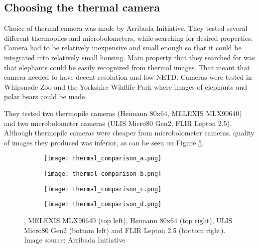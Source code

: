 \subsection{ Choosing the thermal camera}

Choice of thermal camera was made by Arribada Initiative\cite{thermal_comparison}.
They tested several different thermopiles and microbolometers, while searching for desired properties.
Camera had to be relatively inexpensive and small enough so that it could be integrated into relatively small housing.
Main property that they searched for was that elephants could be easily recognized from thermal images.
That meant that camera needed to have decent resolution and low NETD.
Cameras were tested in Whipsnade Zoo and the Yorkshire Wildlife Park where images of elephants and polar bears could be made.

They tested two thermopile cameras (Heimann 80x64, MELEXIS MLX90640) and two microbolometer cameras (ULIS Micro80 Gen2, FLIR Lepton 2.5).
Although thermopile cameras were cheaper from microbolometer cameras, quality of images they produced was inferior, as can be seen on Figure \ref{thermal_comparison_images}.

\begin{figure}[ht]
    \begin{subfigure}{0.5\textwidth}
        \centering
        \texttt{[image: thermal\_comparison\_a.png]} 
        \label{thermal_comparison_a}
    \end{subfigure}
    \begin{subfigure}{0.5\textwidth}
        \centering
        \texttt{[image: thermal\_comparison\_b.png]} 
        \label{thermal_comparison_b}
    \end{subfigure}
    \begin{subfigure}{0.5\textwidth}
        \centering
        \texttt{[image: thermal\_comparison\_c.png]} 
        \label{thermal_comparison_c}
    \end{subfigure}
    \begin{subfigure}{0.5\textwidth}
        \centering
        \texttt{[image: thermal\_comparison\_d.png]} 
        \label{thermal_comparison_d}
    \end{subfigure}
\caption[Comparison of image quality made by different thermal cameras]{, MELEXIS MLX90640 (top left), Heimann 80x64 (top right), ULIS Micro80 Gen2 (bottom left) and FLIR Lepton 2.5 (bottom right). Image source: Arribada Initiative \cite{thermal_comparison}}
    \label{thermal_comparison_images}
\end{figure}

